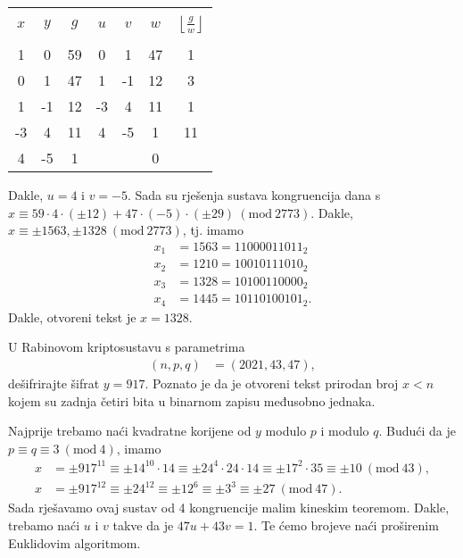 \documentclass{exam}
\newcommand{\Mod}[1]{\ (\mathrm{mod}\ #1)}
\begin{document}
\begin{questions}
\begin{solution}
  \begin{tabular}{|c|c|c|c|c|c|c|}
    \hline
    & & & & & &\\[-1em]
    $x$ & $y$ & $g$ & $u$ & $v$ & $w$ & $\left\lfloor \frac{g}{w} \right\rfloor$\\
    & & & & & &\\[-1em]
    \hline
    1 & 0 & 59 & 0 & 1 & 47 & 1\\
    0 & 1 & 47 & 1 & -1 & 12 & 3\\
    1 & -1 & 12 & -3 & 4 & 11 & 1\\
    -3 & 4 & 11 & 4 & -5 & 1 & 11\\
    4 & -5 & 1 & & & 0 &\\
    \hline
  \end{tabular}

  Dakle, $u = 4$ i $v = -5$. Sada su rješenja sustava kongruencija dana s $x \equiv 59 \cdot 4 \cdot (\pm 12) + 47 \cdot (-5) \cdot (\pm 29) \Mod{2773}$. Dakle, $x \equiv \pm 1563, \pm 1328 \Mod{2773}$, tj. imamo
  \begin{align*}
    x_1 &= 1563 = 11000011011_2\\
    x_2 &= 1210 = 10010111010_2\\
    x_3 &= 1328 = 10100110000_2\\
    x_4 &= 1445 = 10110100101_2.
  \end{align*}
  Dakle, otvoreni tekst je $x = 1328$.
\end{solution}

\pagebreak

\question U Rabinovom kriptosustavu s parametrima
\begin{align*}
  (n, p, q) &= (2021, 43, 47),
\end{align*}
dešifrirajte šifrat $y = 917$. Poznato je da je otvoreni tekst prirodan broj $x < n$ kojem su zadnja četiri bita u binarnom zapisu međusobno jednaka.

\begin{solution}
  Najprije trebamo naći kvadratne korijene od $y$ modulo $p$ i modulo $q$. Budući da je $p \equiv q \equiv 3 \Mod{4}$, imamo
  \begin{align*}
    x &= \pm 917^{11} \equiv \pm 14^{10} \cdot 14 \equiv \pm 24^4 \cdot 24 \cdot 14 \equiv \pm 17^2 \cdot 35 \equiv \pm 10 \Mod{43},\\
    x &= \pm 917^{12} \equiv \pm 24^{12} \equiv \pm 12^6 \equiv \pm 3^3 \equiv \pm 27 \Mod{47}.
  \end{align*}
  Sada rješavamo ovaj sustav od 4 kongruencije malim kineskim teoremom. Dakle, trebamo naći $u$ i $v$ takve da je $47u + 43v = 1$. Te ćemo brojeve naći proširenim Euklidovim algoritmom.


\end{solution}
\end{questions}
\end{document}
